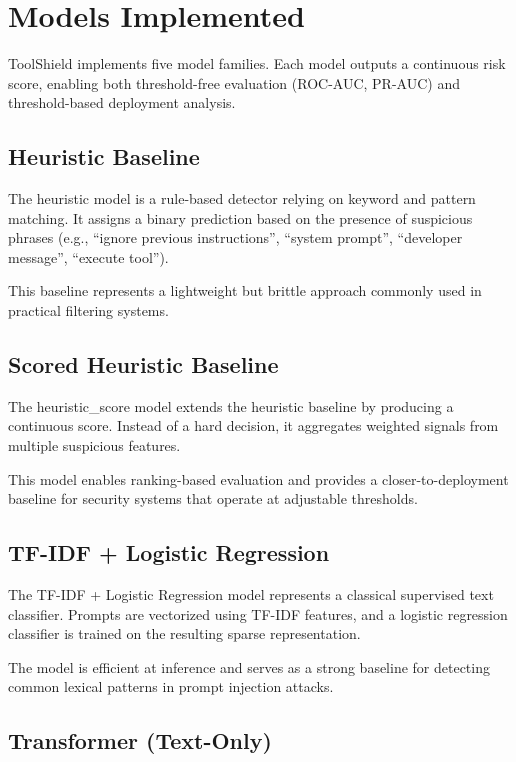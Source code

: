 \section{Models Implemented}
\label{subsec:models}

ToolShield implements five model families. Each model outputs a continuous risk score, enabling both threshold-free evaluation (ROC-AUC, PR-AUC) and threshold-based deployment analysis.

\subsection{Heuristic Baseline}
\label{subsec:heuristic_model}

The heuristic model is a rule-based detector relying on keyword and pattern matching. It assigns a binary prediction based on the presence of suspicious phrases (e.g., ``ignore previous instructions'', ``system prompt'', ``developer message'', ``execute tool'').

This baseline represents a lightweight but brittle approach commonly used in practical filtering systems.

\subsection{Scored Heuristic Baseline}
\label{subsec:heuristic_score_model}

The heuristic\_score model extends the heuristic baseline by producing a continuous score. Instead of a hard decision, it aggregates weighted signals from multiple suspicious features.

This model enables ranking-based evaluation and provides a closer-to-deployment baseline for security systems that operate at adjustable thresholds.

\subsection{TF-IDF + Logistic Regression}
\label{subsec:tfidf_model}

The TF-IDF + Logistic Regression model represents a classical supervised text classifier. Prompts are vectorized using TF-IDF features, and a logistic regression classifier is trained on the resulting sparse representation.

The model is efficient at inference and serves as a strong baseline for detecting common lexical patterns in prompt injection attacks.

\subsection{Transformer (Text-Only)}
\label{subsec:transformer_model}

